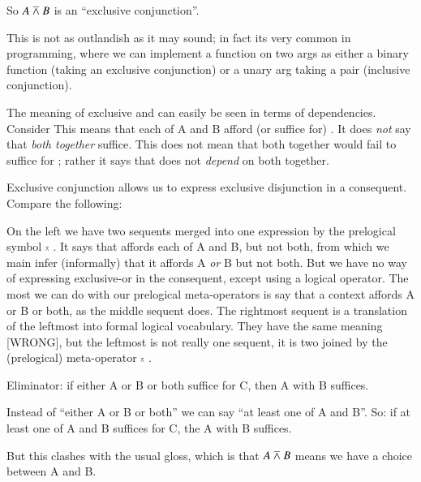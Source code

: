 \documentclass{article}
\begin{document}
So \(A\barwedge B\) is an ``exclusive conjunction''.

This is not as outlandish as it may sound; in fact its very common in
programming, where we can implement a function on two args as either a
binary function (taking an exclusive conjunction) or a unary arg
taking a pair (inclusive conjunction).

The meaning of exclusive and can easily be seen in terms of
dependencies. Consider
This means that each of A and B afford (or suffice for)
\ContextD. It does \textit{not} say that \textit{both together}
suffice. This does not mean that both together would fail to suffice
for \ContextD; rather it says that \ContextD does not \textit{depend}
on both together.

Exclusive conjunction allows us to express exclusive disjunction in a
consequent. Compare the following:


On the left we have two sequents merged into one expression by the
prelogical symbol \(\scriptscriptstyle\barwedge\ \). It says that \ContextG affords each of
A and B, but not both, from which we main infer (informally) that it
affords A \textit{or} B but not both. But we have no way of expressing
exclusive-or in the consequent, except using a logical operator. The
most we can do with our prelogical meta-operators is say that a
context affords A or B or both, as the middle sequent does. The
rightmost sequent is a translation of the leftmost into formal logical
vocabulary. They have the same meaning [WRONG], but the leftmost is
not really one sequent, it is two joined by the (prelogical)
meta-operator \(\scriptscriptstyle\barwedge\ \).

Eliminator: if either A or B or both suffice for C, then A with B
suffices.

Instead of ``either A or B or both'' we can say ``at least one of A
and B''. So: if at least one of A and B suffices for C, the A with B
suffices.

But this clashes with the usual gloss, which is that \(A\barwedge B\) means we have a choice between A and B.
\end{document}
